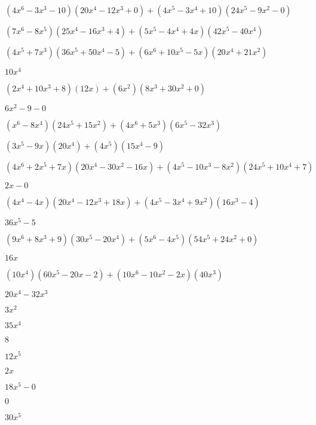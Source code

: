 \documentclass{article}
\begin{document}
\begin{multicols}{2}
$(4x^{6}-3x^{3}-10)(20x^{4}-12x^{3}+0)+(4x^{5}-3x^{4}+10)(24x^{5}-9x^{2}-0)$\item $(7x^{6}-8x^{5})(25x^{4}-16x^{3}+4)+(5x^{5}-4x^{4}+4x)(42x^{5}-40x^{4})$\item $(4x^{5}+7x^{3})(36x^{5}+50x^{4}-5)+(6x^{6}+10x^{5}-5x)(20x^{4}+21x^{2})$\item $10x^{4}$\item $(2x^{4}+10x^{3}+8)(12x)+(6x^2)(8x^{3}+30x^{2}+0)$\item $6x^{2}-9-0$\item $(x^{6}-8x^{4})(24x^{5}+15x^{2})+(4x^{6}+5x^{3})(6x^{5}-32x^{3})$\item $(3x^{5}-9x)(20x^{4})+(4x^{5})(15x^{4}-9)$\item $(4x^{6}+2x^{5}+7x)(20x^{4}-30x^{2}-16x)+(4x^{5}-10x^{3}-8x^2)(24x^{5}+10x^{4}+7)$\item $2x-0$\item $(4x^{4}-4x)(20x^{4}-12x^{3}+18x)+(4x^{5}-3x^{4}+9x^2)(16x^{3}-4)$\item $36x^{5}-5$\item $(9x^{6}+8x^{3}+9)(30x^{5}-20x^{4})+(5x^{6}-4x^{5})(54x^{5}+24x^{2}+0)$\item $16x$\item $(10x^{4})(60x^{5}-20x-2)+(10x^{6}-10x^2-2x)(40x^{3})$\item $20x^{4}-32x^{3}$\item $3x^{2}$\item $35x^{4}$\item $8$\item $12x^{5}$\item $2x$\item $18x^{5}-0$\item $0$\item $30x^{5}$\item 
\end{multicols}
\end{document}
